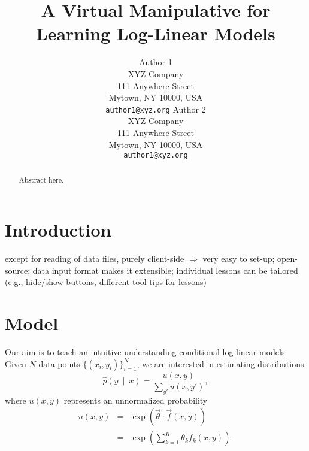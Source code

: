 \documentclass[11pt,letterpaper]{article}
\title{A Virtual Manipulative for Learning Log-Linear Models}
\author{
	 Author 1\\
	    XYZ Company\\
	    111 Anywhere Street\\
	    Mytown, NY 10000, USA\\
	    {\tt author1@xyz.org}
	  \And
	  Author 2\\
	    XYZ Company\\
	    111 Anywhere Street\\
	    Mytown, NY 10000, USA\\
	    {\tt author1@xyz.org}
 }
\date{}
\begin{document}
\maketitle

\begin{abstract}
Abstract here.
\end{abstract}

\section{Introduction}\label{sec:intro}
except for reading of data files, purely client-side $\Rightarrow$ very easy to set-up;
open-source;
data input format makes it extensible;
individual lessons can be tailored (e.g., hide/show buttons, different tool-tips for lessons)

\section{Model}
Our aim is to teach an intuitive understanding conditional log-linear models. Given $N$ data points $\{( x_i, y_i)\}_{i=1}^N$, we are interested in estimating distributions 
\begin{equation}
\hat{p}(y\ \mid\ x) = \frac{u(x, y)}{\sum_{y'} u(x,y')},
\end{equation}
where $u(x,y)$ represents an unnormalized probability
\begin{eqnarray}
u(x,y) & = & \exp{\left(\vec{\theta}\cdot \vec{f}(x,y)\right)}\\
& = & \exp{\left(\sum_{k=1}^K \theta_k f_k(x,y)\right)}.
\end{eqnarray}
\end{document}
